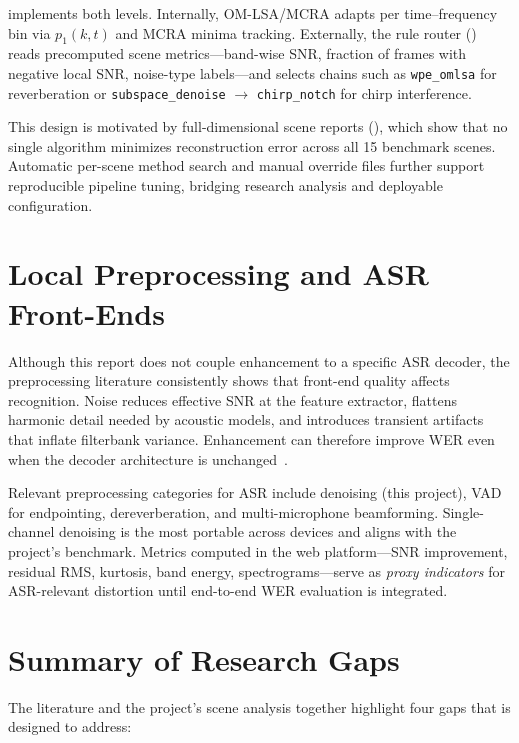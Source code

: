 \projectshort{} implements both levels. Internally, OM-LSA/MCRA adapts per time--frequency bin via $p_1(k,t)$ and MCRA minima tracking. Externally, the rule router () reads precomputed scene metrics---band-wise SNR, fraction of frames with negative local SNR, noise-type labels---and selects chains such as \texttt{wpe\_omlsa} for reverberation or \texttt{subspace\_denoise} $\rightarrow$ \texttt{chirp\_notch} for chirp interference.

This design is motivated by full-dimensional scene reports (), which show that no single algorithm minimizes reconstruction error across all 15 benchmark scenes. Automatic per-scene method search and manual override files further support reproducible pipeline tuning, bridging research analysis and deployable configuration.

\section{Local Preprocessing and ASR Front-Ends}
\label{sec:asr_frontends}

Although this report does not couple enhancement to a specific ASR decoder, the preprocessing literature consistently shows that front-end quality affects recognition. Noise reduces effective SNR at the feature extractor, flattens harmonic detail needed by acoustic models, and introduces transient artifacts that inflate filterbank variance. Enhancement can therefore improve WER even when the decoder architecture is unchanged~\cite{loizou2013}.

Relevant preprocessing categories for ASR include denoising (this project), VAD for endpointing, dereverberation, and multi-microphone beamforming. Single-channel denoising is the most portable across devices and aligns with the project's benchmark. Metrics computed in the web platform---SNR improvement, residual RMS, kurtosis, band energy, spectrograms---serve as \emph{proxy indicators} for ASR-relevant distortion until end-to-end WER evaluation is integrated.

\section{Summary of Research Gaps}
\label{sec:gaps}

The literature and the project's scene analysis together highlight four gaps that \projectshort{} is designed to address:

